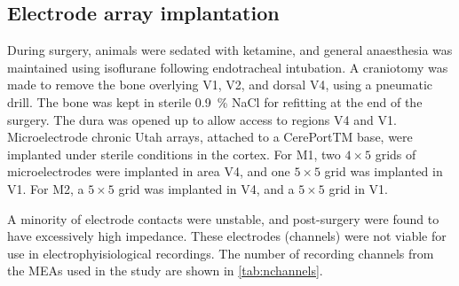 \subsection{Electrode array implantation}

During surgery, animals were sedated with ketamine, and general anaesthesia was maintained using isoflurane following endotracheal intubation.
A craniotomy was made to remove the bone overlying \ac{V1}, \ac{V2}, and dorsal \ac{V4}, using a pneumatic drill.
The bone was kept in sterile \SI{0.9}{\percent} \ac{NaCl} for refitting at the end of the surgery.
The dura was opened up to allow access to regions \ac{V4} and \ac{V1}.
Microelectrode chronic Utah arrays, attached to a CerePortTM base, were implanted under sterile conditions in the cortex.
For \ac{M1}, two $4{\times}5$ grids of microelectrodes were implanted in area \ac{V4}, and one $5{\times}5$ grid was implanted in \ac{V1}.
For \ac{M2}, a $5{\times}5$ grid was implanted in \ac{V4}, and a $5{\times}5$ grid in \ac{V1}.

A minority of electrode contacts were unstable, and post-surgery were found to have excessively high impedance.
These electrodes (channels) were not viable for use in electrophyisiological recordings.
The number of recording channels from the \acp{MEA} used in the study are shown in \autoref{tab:nchannels}.

